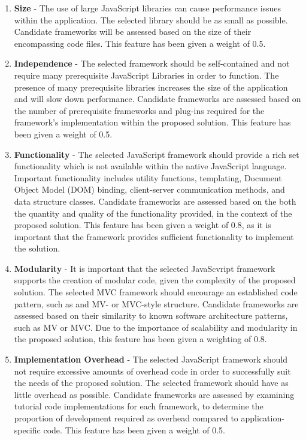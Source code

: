 \documentclass{report}
\begin{document}
\begin{enumerate}

\item \textbf{Size} - The use of large JavaScript libraries can cause performance issues within the application. The selected library should be as small as possible. Candidate frameworks will be assessed based on the size of their encompassing code files. This feature has been given a weight of 0.5.

\item \textbf{Independence} - The selected framework should be self-contained and not require many prerequisite JavaScript Libraries in order to function. The presence of many prerequisite libraries increases the size of the application and will slow down performance. Candidate frameworks are assessed based on the number of prerequisite frameworks and plug-ins required for the framework's implementation within the proposed solution. This feature has been given a weight of 0.5.

\item \textbf{Functionality} - The selected JavaScript framework should provide a rich set functionality which is not available within the native JavaScript language. Important functionality includes utility functions, templating, Document Object Model (DOM) binding, client-server communication methods, and data structure classes. Candidate frameworks are assessed based on the both the quantity and quality of the functionality provided, in the context of the proposed solution. This feature has been given a weight of 0.8, as it is important that the framework provides sufficient functionality to implement the solution.

\item \textbf{Modularity} - It is important that the selected JavaScvript framework supports the creation of modular code, given the complexity of the proposed solution. The selected MVC framework should encourage an established code pattern, such as and MV- or MVC-style structure. Candidate frameworks are assessed based on their similarity to known software architecture patterns, such as MV or MVC. Due to the importance of scalability and modularity in the proposed solution, this feature has been given a weighting of 0.8.

\item \textbf{Implementation Overhead} - The selected JavaScript framework should not require excessive amounts of overhead code in order to successfully suit the needs of the proposed solution. The selected framework should have as little overhead as possible. Candidate frameworks are assessed by examining tutorial code implementations for each framework, to determine the proportion of development required as overhead compared to application-specific code. This feature has been given a weight of 0.5.

\end{enumerate}
\end{document}

